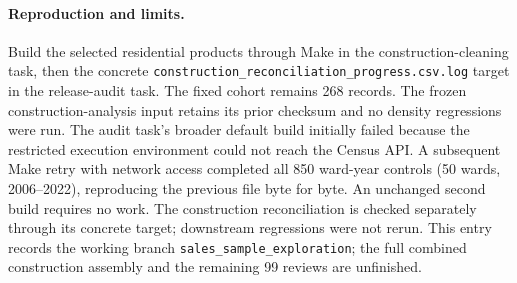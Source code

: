 \paragraph{Reproduction and limits.} Build the selected residential products through Make in the construction-cleaning task, then the concrete \texttt{construction\_reconciliation\_progress.csv.log} target in the release-audit task. The fixed cohort remains 268 records. The frozen construction-analysis input retains its prior checksum and no density regressions were run. The audit task's broader default build initially failed because the restricted execution environment could not reach the Census API. A subsequent Make retry with network access completed all 850 ward-year controls (50 wards, 2006--2022), reproducing the previous file byte for byte. An unchanged second build requires no work. The construction reconciliation is checked separately through its concrete target; downstream regressions were not rerun. This entry records the working branch \texttt{sales\_sample\_exploration}; the full combined construction assembly and the remaining 99 reviews are unfinished.
